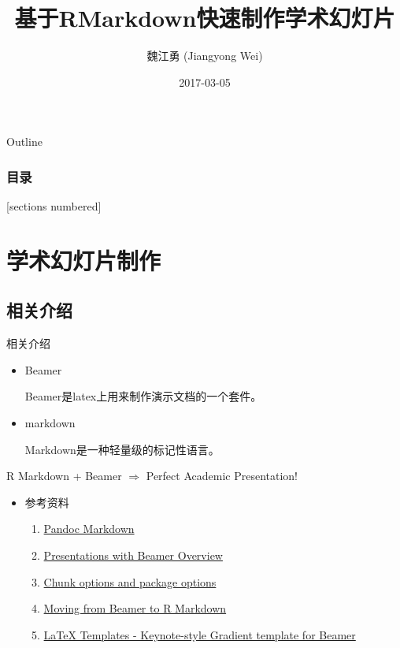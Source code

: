 \documentclass[10pt,ignorenonframetext,aspectratio=169,t,]{beamer} %
\title{基于RMarkdown快速制作学术幻灯片}
\author{魏江勇 (Jiangyong Wei)}
\institute{中南财经政法大学统计与数学学院, \emph {datalab026a@qq.com}}
\date{2017-03-05}
\providecommand{\tightlist}{%
  \setlength{\itemsep}{0pt}\setlength{\parskip}{0pt}}
\begin{document}
\frame{\titlepage}

\maketitle

\begin{frame}{Outline}
	\frametitle{目录}  
	[sections numbered]
	\tableofcontents[hidesubsections]
\end{frame}

\section{学术幻灯片制作}

\subsection{相关介绍}

\begin{frame}{相关介绍}

\begin{itemize}
\item
  Beamer

  Beamer是latex上用来制作演示文档的一个套件。
\item
  markdown

  Markdown是一种轻量级的标记性语言。
\end{itemize}

\vspace{12pt}

R Markdown + Beamer \(\Longrightarrow\) Perfect Academic Presentation!

\vspace{12pt}

\begin{itemize}
\item
  参考资料

  \begin{enumerate}
  \def\labelenumi{\arabic{enumi}.}
  \tightlist
  \item
    \href{http://rmarkdown.rstudio.com/authoring_pandoc_markdown.html}{Pandoc
    Markdown}
  \item
    \href{http://rmarkdown.rstudio.com/beamer_presentation_format.html}{Presentations
    with Beamer Overview}
  \item
    \href{http://yihui.name/knitr/options/}{Chunk options and package
    options}
  \item
    \href{http://rmarkdown.rstudio.com/articles_beamer.html}{Moving from
    Beamer to R Markdown}
  \item
    \href{http://www.ucl.ac.uk/~ucbpeal/latexposter.html}{LaTeX
    Templates - Keynote-style Gradient template for Beamer}
  \end{enumerate}
\end{itemize}

\end{frame}
\end{document}
